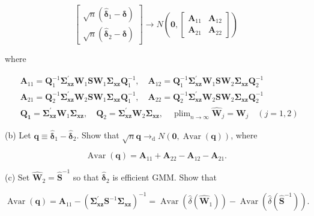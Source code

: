 \documentclass[10pt]{article}
\begin{document}
$$
\left[\begin{array}{c}
\sqrt{n}\left(\hat{\boldsymbol{\delta}}_{1}-\boldsymbol{\delta}\right) \\
\sqrt{n}\left(\hat{\boldsymbol{\delta}}_{2}-\boldsymbol{\delta}\right)
\end{array}\right] \rightarrow N\left(\mathbf{0},\left[\begin{array}{ll}
\mathbf{A}_{11} & \mathbf{A}_{12} \\
\mathbf{A}_{21} & \mathbf{A}_{22}
\end{array}\right]\right)
$$

where

$$
\begin{aligned}
& \mathbf{A}_{11}=\mathbf{Q}_{1}^{-1} \boldsymbol{\Sigma}_{\mathbf{x z}}^{\prime} \mathbf{W}_{1} \mathbf{S} \mathbf{W}_{1} \boldsymbol{\Sigma}_{\mathbf{x z}} \mathbf{Q}_{1}^{-1}, \quad \mathbf{A}_{12}=\mathbf{Q}_{1}^{-1} \boldsymbol{\Sigma}_{\mathbf{x z}}^{\prime} \mathbf{W}_{1} \mathbf{S} \mathbf{W}_{2} \boldsymbol{\Sigma}_{\mathbf{x z}} \mathbf{Q}_{2}^{-1} \\
& \mathbf{A}_{21}=\mathbf{Q}_{2}^{-1} \boldsymbol{\Sigma}_{\mathbf{x z}}^{\prime} \mathbf{W}_{2} \mathbf{S} \mathbf{W}_{1} \boldsymbol{\Sigma}_{\mathbf{x z}} \mathbf{Q}_{1}^{-1}, \quad \mathbf{A}_{22}=\mathbf{Q}_{2}^{-1} \boldsymbol{\Sigma}_{\mathbf{x z}}^{\prime} \mathbf{W}_{2} \mathbf{S} \mathbf{W}_{2} \boldsymbol{\Sigma}_{\mathbf{x z}} \mathbf{Q}_{2}^{-1} \\
& \mathbf{Q}_{\mathbf{1}}=\mathbf{\Sigma}_{\mathbf{x z}}^{\prime} \mathbf{W}_{1} \boldsymbol{\Sigma}_{\mathbf{x z}}, \quad \mathbf{Q}_{2}=\boldsymbol{\Sigma}_{\mathbf{x z}}^{\prime} \mathbf{W}_{2} \boldsymbol{\Sigma}_{\mathbf{x z}}, \quad \operatorname{plim}_{n \rightarrow \infty} \widehat{\mathbf{W}}_{j}=\mathbf{W}_{j} \quad(j=1,2)
\end{aligned}
$$

(b) Let $\mathbf{q} \equiv \hat{\boldsymbol{\delta}}_{1}-\hat{\boldsymbol{\delta}}_{2}$. Show that $\sqrt{n} \mathbf{q} \rightarrow_{\mathrm{d}} N(\mathbf{0}, \operatorname{Avar}(\mathbf{q}))$, where

$$
\operatorname{Avar}(\mathbf{q})=\mathbf{A}_{11}+\mathbf{A}_{22}-\mathbf{A}_{12}-\mathbf{A}_{21} .
$$

(c) Set $\widehat{\mathbf{W}}_{2}=\widehat{\mathbf{S}}^{-1}$ so that $\hat{\boldsymbol{\delta}}_{2}$ is efficient GMM. Show that

$$
\operatorname{Avar}(\mathbf{q})=\mathbf{A}_{11}-\left(\boldsymbol{\Sigma}_{\mathbf{x z}}^{\prime} \mathbf{S}^{-1} \boldsymbol{\Sigma}_{\mathbf{x z}}\right)^{-1}=\operatorname{Avar}\left(\hat{\delta}\left(\widehat{\mathbf{W}}_{1}\right)\right)-\operatorname{Avar}\left(\hat{\delta}\left(\widehat{\mathbf{S}}^{-1}\right)\right) .
$$
\end{document}
